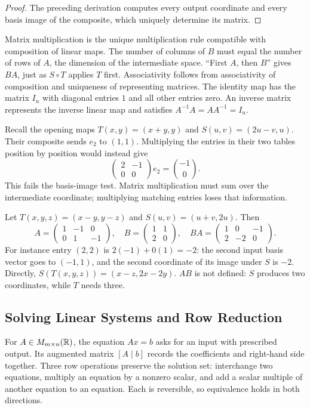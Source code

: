 \begin{proof}
The preceding derivation computes every output coordinate and every
basis image of the composite, which uniquely determine its matrix.
\end{proof}
Matrix multiplication is the unique multiplication rule compatible with
composition of linear maps. The number of columns of $B$ must equal
the number of rows of $A$, the dimension of the intermediate space.
``First $A$, then $B$'' gives $BA$, just as $S\circ T$ applies $T$ first.
Associativity follows from associativity of composition and uniqueness of
representing matrices. The identity map has the matrix $I_n$ with diagonal
entries $1$ and all other entries zero. An inverse matrix represents the
inverse linear map and satisfies $A^{-1}A=AA^{-1}=I_n$.

\begin{example}
Recall the opening maps $T(x,y)=(x+y,y)$ and $S(u,v)=(2u-v,u)$.
Their composite sends $e_2$ to $(1,1)$. Multiplying the entries in their
two tables position by position would instead give
\[
\begin{pmatrix}2&-1\\0&0\end{pmatrix}e_2=\binom{-1}{0}.
\]
This fails the basis-image test. Matrix multiplication must sum over the
intermediate coordinate; multiplying matching entries loses that information.
\end{example}

\begin{example}
Let $T(x,y,z)=(x-y,y-z)$ and $S(u,v)=(u+v,2u)$. Then
\[
A=\begin{pmatrix}1&-1&0\\0&1&-1\end{pmatrix},\quad
B=\begin{pmatrix}1&1\\2&0\end{pmatrix},\quad
BA=\begin{pmatrix}1&0&-1\\2&-2&0\end{pmatrix}.
\]
For instance entry $(2,2)$ is $2(-1)+0(1)=-2$: the second input
basis vector goes to $(-1,1)$, and the second coordinate of its image
under $S$ is $-2$. Directly, $S(T(x,y,z))=(x-z,2x-2y)$.
$AB$ is not defined: $S$ produces two coordinates, while $T$ needs three.
\end{example}
\subsection{Solving Linear Systems and Row Reduction}
For $A\in M_{m\times n}(\mathbb{R})$, the equation $Ax=b$ asks for an input
with prescribed output. Its augmented matrix $[A\mid b]$ records the
coefficients and right-hand side together. Three row operations preserve
the solution set: interchange two equations, multiply an equation by a
nonzero scalar, and add a scalar multiple of another equation to an equation.
Each is reversible, so equivalence holds in both directions.

